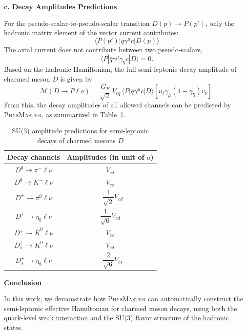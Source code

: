 \documentclass[11pt, a4paper, logo, copyright, nonumbering]{SAI}
\newcommand{\agent}{\textsc{PhysMaster}\xspace}
\begin{document}
\medskip
\noindent \textbf{c. Decay Amplitudes Predictions}

For the pseudo-scalar-to-pseudo-scalar transition \(D(p) \to P(p')\), only the hadronic matrix element of the vector current contributes:
\[
\langle P(p')|\bar q \gamma^\mu c|D(p)\rangle
\]
The axial current does not contribute between two pseudo-scalars,
\[
\langle P|\bar q \gamma^\mu\gamma_5 c|D\rangle = 0.
\]
Based on the hadronic Hamiltonian, the full semi-leptonic decay amplitude of charmed meson $D$ is given by
\[
\mathcal{M}(D\to P \ell\nu)
  = \frac{G_F}{\sqrt{2}}\, V_{cq}\,
    \langle P|\bar q \gamma^\mu c|D\rangle
    \left[\bar u_\ell \gamma_\mu (1-\gamma_5) v_{\nu}\right].
\]
From this, the decay amplitudes of all allowed channels can be predicted by \agent, as summarized in Table~\ref{tab:Gamma Matrix Map}.


\begin{table}[ht]
    \centering
    \renewcommand{\arraystretch}{1.5}
      \setlength{\tabcolsep}{3mm}
    \begin{tabular}{c c}
        \hline\hline
        Decay channels & Amplitudes (in unit of $a$) \\
         \hline
        $D^0\to\pi^-\ell\nu$ & $V_{cd}$   \\

        $D^0\to K^-\ell\nu$ & $V_{cs}$   \\

        $D^+\to\pi^0\ell\nu$ & $-\dfrac{1}{\sqrt2} V_{cd}$   \\
       
        $D^+\to\eta_8\ell\nu$ & $\dfrac{1}{\sqrt6} V_{cd}$   \\
        
        $D^+\to\bar K^0\ell\nu$ & $V_{cs}$   \\

        $D^+_s\to K^0\ell\nu$ & $V_{cd}$   \\

        $D^+_s\to\eta_8\ell\nu$ & $-\dfrac{2}{\sqrt6} V_{cs}$   \\
        \hline
    \end{tabular}
    \caption{SU(3) amplitude predictions for semi-leptonic decays of charmed mesons $D$}  
    \label{tab:Gamma Matrix Map}
\end{table}

\newpage
\noindent \textbf{Conclusion}

In this work, we demonstrate how \agent can automatically construct the semi-leptonic effective Hamiltonian for charmed meson decays, using both the quark-level weak interaction and the SU(3) flavor structure of the hadronic states.
\end{document}
